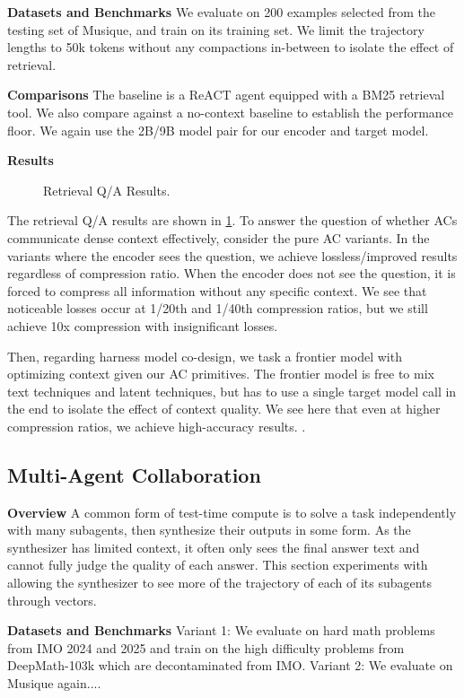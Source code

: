 \textbf{Datasets and Benchmarks}
We evaluate on 200 examples selected from the testing set of Musique, and train on its training set. We limit the trajectory lengths to 50k tokens without any compactions in-between to isolate the effect of retrieval.

\textbf{Comparisons} The baseline is a ReACT agent equipped with a BM25 retrieval tool. We also compare against a no-context baseline to establish the performance floor. We again use the 2B/9B model pair for our encoder and target model.

\textbf{Results}
\begin{figure}[t]
  \centering
  \caption{Retrieval Q/A Results.}
  \label{fig:evalRetrievalQA}
\end{figure}
The retrieval Q/A results are shown in \cref{fig:evalRetrievalQA}. 
To answer the question of whether ACs communicate dense context effectively, consider the pure AC variants. In the variants where the encoder sees the question, we achieve lossless/improved results regardless of compression ratio. When the encoder does not see the question, it is forced to compress all information without any specific context. We see that noticeable losses occur at 1/20th and 1/40th compression ratios, but we still achieve 10x compression with insignificant losses.

Then, regarding harness model co-design, we task a frontier model with optimizing context given our AC primitives. The frontier model is free to mix text techniques and latent techniques, but has to use a single target model call in the end to isolate the effect of context quality. We see here that even at higher compression ratios, we achieve high-accuracy results. .



\subsection{Multi-Agent Collaboration}
\textbf{Overview} A common form of test-time compute is to solve a task independently with many subagents, then synthesize their outputs in some form. As the synthesizer has limited context, it often only sees the final answer text and cannot fully judge the quality of each answer. This section experiments with allowing the synthesizer to see more of the trajectory of each of its subagents through vectors.

\textbf{Datasets and Benchmarks}
Variant 1: We evaluate on hard math problems from IMO 2024 and 2025 and train on the high difficulty problems from DeepMath-103k which are decontaminated from IMO. 
Variant 2: We evaluate on Musique again....

